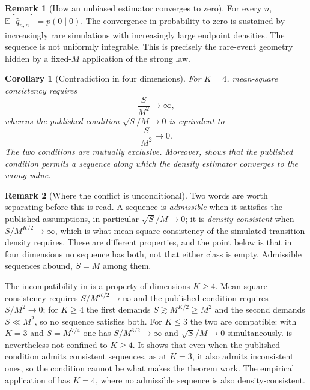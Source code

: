 \documentclass[11pt]{article}
\newtheorem{corollary}[corollary]{Corollary}
\theoremstyle{definition}
\newtheorem{remark}[remark]{Remark}
\newcommand{\E}{\mathbb{E}}
\begin{document}
\begin{remark}[How an unbiased estimator converges to zero]\label{rem:mean_median}
For every $n$, $\E[\widehat q_{n,n}]=p(0\mid0)$. The convergence in probability to zero is sustained by increasingly rare simulations with increasingly large endpoint densities. The sequence is not uniformly integrable. This is precisely the rare-event geometry hidden by a fixed-$M$ application of the strong law.
\end{remark}

\begin{corollary}[Contradiction in four dimensions]\label{cor:contradiction}
For $K=4$, mean-square consistency requires
\[
\frac{S}{M^2}\longrightarrow\infty,
\]
whereas the published condition $\sqrt S/M\to0$ is equivalent to
\[
\frac{S}{M^2}\longrightarrow0.
\]
The two conditions are mutually exclusive. Moreover,  shows that the published condition permits a sequence along which the density estimator converges to the wrong value.
\end{corollary}

\begin{remark}[Where the conflict is unconditional]
Two words are worth separating before this is read. A sequence is \emph{admissible} when it satisfies the published assumptions, in particular $\sqrt S/M\to0$; it is \emph{density-consistent} when $S/M^{K/2}\to\infty$, which is what mean-square consistency of the simulated transition density requires. These are different properties, and the point below is that in four dimensions no sequence has both, not that either class is empty. Admissible sequences abound, $S=M$ among them.

The incompatibility in  is a property of dimensions $K\ge4$. Mean-square consistency requires $S/M^{K/2}\to\infty$ and the published condition requires $S/M^2\to0$; for $K\ge4$ the first demands $S\gtrsim M^{K/2}\ge M^2$ and the second demands $S\ll M^2$, so no sequence satisfies both. For $K\le3$ the two are compatible: with $K=3$ and $S=M^{7/4}$ one has $S/M^{3/2}\to\infty$ and $\sqrt S/M\to0$ simultaneously.  is nevertheless not confined to $K\ge4$. It shows that even when the published condition admits consistent sequences, as at $K=3$, it also admits inconsistent ones, so the condition cannot be what makes the theorem work. The empirical application of \citet{BrandtSantaClara2002} has $K=4$, where no admissible sequence is also density-consistent.
\end{remark}
\end{document}
